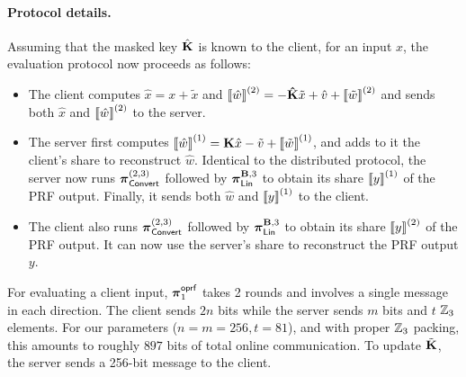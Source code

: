 \paragraph{Protocol details.} Assuming that the masked key $\hat{\mat{K}}$ is known to the client, for an input $x$,  the evaluation protocol now proceeds as follows:
\begin{itemize}
  \item The client computes $\hat{x} = x + \tilde{x}$ and $\share{\hat{w}}^{(2)} = -\mat{\hat{K}}\tilde{x} + \hat{v} + \share{\tilde{w}}^{(2)}$ and sends both $\hat{x}$ and $\left\llbracket \hat{w} \right\rrbracket^{(2)}$ to the server.

  \item The server first computes $\share{\hat{w}}^{(1)} = \mat{K}\hat{x} - \tilde{v} + \share{\tilde{w}}^{(1)}$, and adds to it the client's share to reconstruct $\hat{w}$. Identical to the distributed protocol, the server now runs $\boldsymbol{\pi}_{\textnormal{\textsf{Convert}}}^{(2,3)}$ followed by $\prot_\LMap^{\mat{B},3}$ to obtain its share $\left\llbracket y \right\rrbracket^{(1)}$ of the PRF output. Finally, it sends both $\hat{w}$ and $\left\llbracket y \right\rrbracket^{(1)}$ to the client.

  \item The client also runs $\boldsymbol{\pi}_{\textnormal{\textsf{Convert}}}^{(2,3)}$ followed by $\prot_\LMap^{\mat{B},3}$ to obtain its share $\left\llbracket y \right\rrbracket^{(2)}$ of the PRF output. It can now use the server's share to reconstruct the PRF output $y$.


\end{itemize}
For evaluating a client input, $\boldsymbol{\pi}^{\textsf{oprf}}_1$ takes 2 rounds and involves a single message in each direction. The client sends $2n$ bits while the server sends $m$ bits and $t$ $\mathbb{Z}_3$ elements. For our parameters ($n=m=256, t=81$), and with proper $\mathbb{Z}_3$ packing, this amounts to roughly $897$ bits of total online communication. To update $\tilde{\mat{K}}$, the server sends a 256-bit message to the client.


